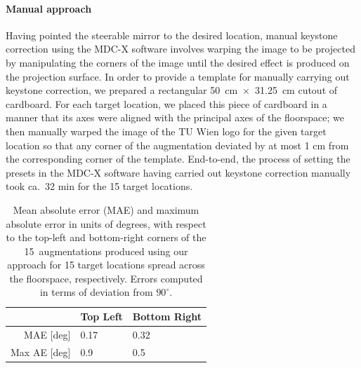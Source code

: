 \documentclass[review]{elsarticle}
\begin{document}
\paragraph{Manual approach} Having pointed the steerable mirror to the desired location, manual keystone correction using the MDC-X software involves warping the image to be projected by manipulating the corners of the image until the desired effect is produced on the projection surface. In order to provide a template for manually carrying out keystone correction, we prepared a rectangular 50~cm~$\times$~31.25~cm cutout of cardboard. For each target location, we placed this piece of cardboard in a manner that its axes were aligned with the principal axes of the floorspace; we then manually warped the image of the TU Wien logo for the given target location so that any corner of the augmentation deviated by at most 1 cm from the corresponding corner of the template. End-to-end, the process of setting the presets in the MDC-X software having carried out keystone correction manually took ca.\ 32 min for the 15 target locations.

\begin{table}[ht!]
\caption{Mean absolute error (MAE) and maximum absolute error in units of degrees, with respect to the top-left and bottom-right corners of the 15~augmentations produced using our approach for 15 target locations spread across the floorspace, respectively. Errors computed in terms of deviation from $90^\circ{}$.}
\label{table:angle}
\centering
{\small
\begin{tabularx}{6.75cm}{r p{1.95cm} p{1.95cm}}
\toprule
  & Top Left & Bottom Right \\
\midrule
MAE {\tiny[deg]} & 0.17 & 0.32 \\
Max AE {\tiny[deg]} & 0.9 & 0.5 \\
\bottomrule
\end{tabularx}}
\end{table}
\end{document}
